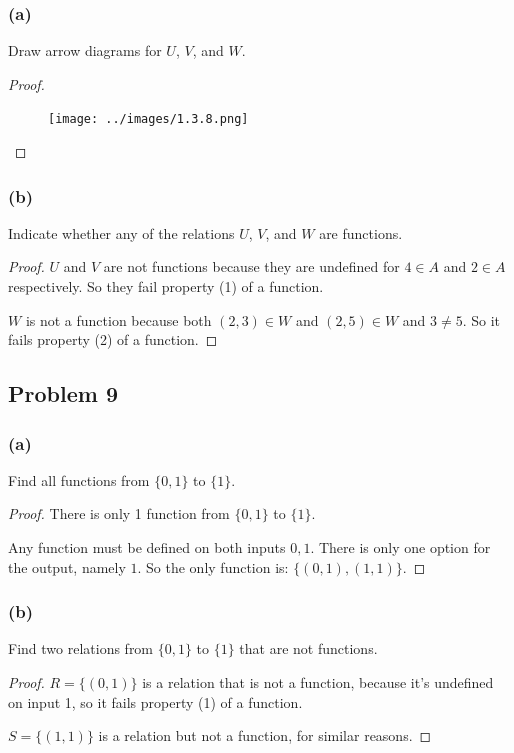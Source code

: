 \documentclass[14pt]{extarticle}
\begin{document}
\subsubsection{(a)}
Draw arrow diagrams for $U$, $V$, and $W$.

\begin{proof}
    \begin{figure}[ht!]
        \centering
        \texttt{[image: ../images/1.3.8.png]}
    \end{figure}
\end{proof}

\subsubsection{(b)}
Indicate whether any of the relations $U$, $V$, and $W$ are functions.

\begin{proof}
    $U$ and $V$ are not functions because they are undefined for $4 \in A$ and
    $2 \in A$ respectively. So they fail property (1) of a function.

    $W$ is not a function because both $(2, 3) \in W$ and $(2, 5) \in W$ and
    $3 \neq 5$. So it fails property (2) of a function.
\end{proof}

\subsection{Problem 9}

\subsubsection{(a)}
Find all functions from $\{0, 1\}$ to $\{1\}$.

\begin{proof}
    There is only 1 function from $\{0, 1\}$ to $\{1\}$.

    Any function must be defined on both inputs $0, 1$. There is only one option for
    the output, namely $1$. So the only function is: $\{(0, 1), (1, 1)\}$.
\end{proof}

\subsubsection{(b)}
Find two relations from $\{0, 1\}$ to $\{1\}$ that are not functions.

\begin{proof}
    $R = \{(0, 1)\}$ is a relation that is not a function, because it's undefined
    on input 1, so it fails property (1) of a function.

    $S = \{(1, 1)\}$ is a relation but not a function, for similar reasons.
\end{proof}
\end{document}
